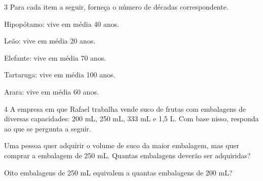 
\num{3} Para cada item a seguir, forneça o número de décadas correspondente.

\begin{escolha}
\item Hipopótamo: vive em média 40 anos.\\


\item Leão: vive em média 20 anos.\\

\item Elefante: vive em média 70 anos.\\

\item Tartaruga: vive em média 100 anos.\\

\item Arara: vive em média 60 anos.\\
\end{escolha}

\num{4} A empresa em que Rafael trabalha vende suco de frutas com embalagens de
diversas capacidades: 200 mL, 250 mL, 333 mL e 1,5 L. Com base nisso, responda ao que se pergunta a seguir.

\begin{escolha}
\item Uma pessoa quer adquirir o volume de suco da maior embalagem,
  mas quer comprar a embalagem de 250 mL. Quantas embalagens deverão ser adquiridas?\\

\item Oito embalagens de 250 mL equivalem a quantas embalagens de 200 mL?\\
\end{escolha}


